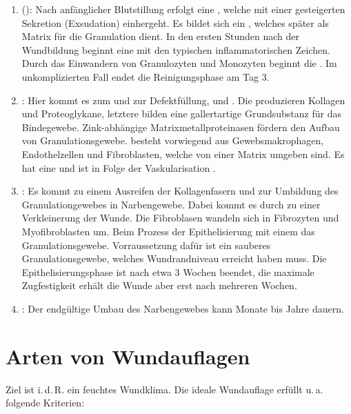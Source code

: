 \begin{enumerate}
  \item {} (): Nach
  anfänglicher Blutstillung erfolgt eine ,
  welche mit einer gesteigerten Sekretion
  (Exsudation) einhergeht. Es bildet sich ein
  , welches später als Matrix für die
  Granulation dient. In den ersten Stunden nach der Wundbildung beginnt eine
   mit den typischen
  inflammatorischen Zeichen. Durch das Einwandern von
  Granulozyten und Monozyten beginnt die . Im unkomplizierten Fall endet die
  Reinigungsphase am Tag 3.
  \item {}: Hier kommt es zum
   und zur Defektfüllung,
   und . Die
   produzieren Kollagen und Proteoglykane,
  letztere bilden eine gallertartige Grundsubstanz für das Bindegewebe.
  Zink-abhängige Matrixmetallproteinasen fördern den Aufbau
  von Granulationsgewebe.  besteht vorwiegend aus
  Gewebsmakrophagen, Endothelzellen und Fibroblasten, welche
  von einer Matrix umgeben sind. Es hat eine  und ist in Folge der
  Vaskularisation .
  \item {}: Es kommt zu einem
  Ausreifen der Kollagenfasern und zur Umbildung des
  Granulationgewebes in Narbengewebe. Dabei kommt es durch
    zu einer Verkleinerung der Wunde. Die
  Fibroblasen wandeln sich in Fibrozyten und Myofibroblasten
  um. Beim Prozess der Epithelisierung  mit einem
   das
  Granulationsgewebe.
  Vorraussetzung dafür ist ein sauberes Granulationsgewebe,
  welches Wundrandniveau erreicht haben muss. Die
  Epithelisierungsphase ist nach etwa 3 Wochen beendet, die maximale Zugfestigkeit erhält
  die Wunde aber erst nach mehreren Wochen.
  \item {}: Der endgültige Umbau des
  Narbengewebes kann Monate bis Jahre dauern.
\end{enumerate}




\section{Arten von Wundauflagen}

Ziel ist i.\,d.\,R. ein feuchtes Wundklima.
Die ideale Wundauflage erfüllt u.\,a. folgende Kriterien:

